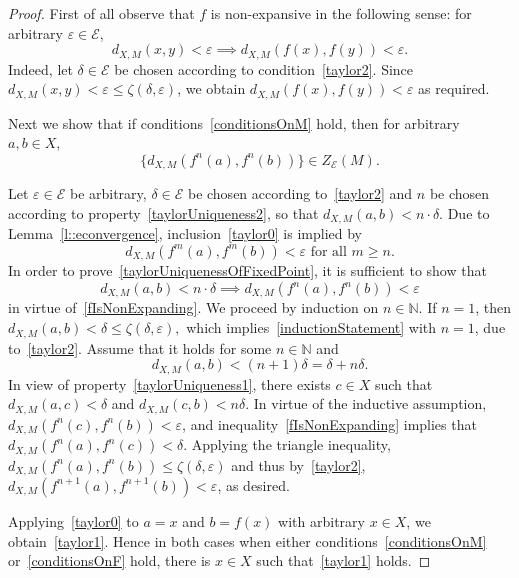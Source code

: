 \documentclass[10pt,a4paper]{amsart}
\newcommand{\EE}{\mathcal{E}}
\newcommand{\NN}{\mathbb N}
\begin{document}
\begin{proof}
First of all observe that $f$ is non-expansive in the following sense: for arbitrary $\varepsilon\in\EE$,
\begin{equation}\label{fIsNonExpanding}
    d_{X,M}(x,y)< \varepsilon\implies d_{X,M}(f(x),f(y))<\varepsilon.
\end{equation}
Indeed, let $\delta\in \EE$ be chosen according to condition~\eqref{taylor2}. Since  $d_{X,M}(x,y)<\varepsilon \leq \zeta(\delta,\varepsilon  )$, we obtain $d_{X,M}(f(x),f(y))<\varepsilon$ as required. 

Next we show that if conditions~\ref{conditionsOnM} hold, then for arbitrary $a,b\in X$, 
\begin{equation}\label{taylor0}
  \{  d_{X,M}(f^n(a),f^{n}(b))\}\in Z_{\EE}(M).
\end{equation}

Let $\varepsilon\in\EE$ be arbitrary, $\delta\in\EE$ be chosen according to~\eqref{taylor2} and $n$ be chosen according to property~\eqref{taylorUniqueness2}, so that $d_{X,M}(a,b)<n\cdot \delta$. Due to Lemma~\ref{l::econvergence}, inclusion~\eqref{taylor0} is implied by \begin{equation}\label{taylorUniquenessOfFixedPoint}
d_{X,M}(f^m(a), f^m(b))< \varepsilon\text{ for all } m\geq n.
\end{equation}
In order to prove~\eqref{taylorUniquenessOfFixedPoint}, it is sufficient to show that 
\begin{equation}\label{inductionStatement}
d_{X,M}(a,b)<n\cdot \delta\implies d_{X,M}(f^n(a), f^n(b))< \varepsilon
\end{equation}
in virtue of~\eqref{fIsNonExpanding}. We proceed by induction on $n\in\NN$. If $n=1$, then 
$
d_{X,M}(a,b) < \delta \leq \zeta(\delta, \varepsilon),
$
which implies~\eqref{inductionStatement} with $n = 1$, due to~\eqref{taylor2}.
Assume that it holds for some $n\in\NN$ and 
$$
d_{X,M}(a,b)< (n+1)\delta = \delta + n\delta.
$$
In view of property~\eqref{taylorUniqueness1}, there exists $c\in X$ such that $d_{X,M}(a,c)<  \delta$ and $d_{X,M}(c,b) < n\delta$. In virtue of the inductive assumption, $d_{X,M}(f^n(c), f^n(b))< \varepsilon$, and  inequality~\eqref{fIsNonExpanding} implies that  $d_{X,M} (f^n(a),f^n(c))< \delta$. Applying the triangle inequality, $
d_{X,M} (f^n(a),f^n(b))
\leq \zeta( \delta, \varepsilon)
$
and thus by~\eqref{taylor2}, $d_{X,M} (f^{n+1}(a),f^{n+1}(b))< \varepsilon$, as desired.

Applying~\eqref{taylor0} to $a = x$ and $b = f(x)$ with arbitrary $x\in X$, we obtain~\eqref{taylor1}. Hence in both cases when either conditions~\ref{conditionsOnM} or~\ref{conditionsOnF} hold, there is $x\in X$ such that~\eqref{taylor1} holds.


\end{proof}
\end{document}
